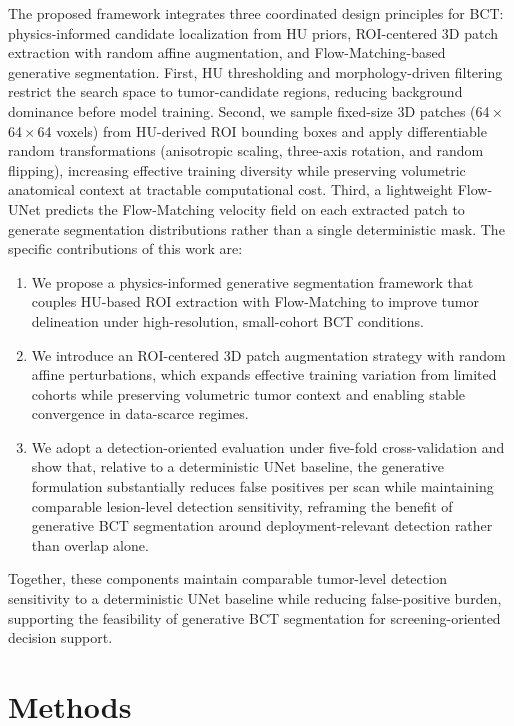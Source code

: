 \documentclass{iopjournal}
\begin{document}
The proposed framework integrates three coordinated design principles for BCT: physics-informed candidate localization from HU priors, ROI-centered 3D patch extraction with random affine augmentation, and Flow-Matching-based generative segmentation. First, HU thresholding and morphology-driven filtering restrict the search space to tumor-candidate regions, reducing background dominance before model training. Second, we sample fixed-size 3D patches (64\,$\times$\,64\,$\times$\,64 voxels) from HU-derived ROI bounding boxes and apply differentiable random transformations (anisotropic scaling, three-axis rotation, and random flipping), increasing effective training diversity while preserving volumetric anatomical context at tractable computational cost. Third, a lightweight Flow-UNet predicts the Flow-Matching velocity field on each extracted patch to generate segmentation distributions rather than a single deterministic mask. The specific contributions of this work are:
\begin{enumerate}
\item We propose a physics-informed generative segmentation framework that couples HU-based ROI extraction with Flow-Matching to improve tumor delineation under high-resolution, small-cohort BCT conditions.
\item We introduce an ROI-centered 3D patch augmentation strategy with random affine perturbations, which expands effective training variation from limited cohorts while preserving volumetric tumor context and enabling stable convergence in data-scarce regimes.
\item We adopt a detection-oriented evaluation under five-fold cross-validation and show that, relative to a deterministic UNet baseline, the generative formulation substantially reduces false positives per scan while maintaining comparable lesion-level detection sensitivity, reframing the benefit of generative BCT segmentation around deployment-relevant detection rather than overlap alone.
\end{enumerate}
Together, these components maintain comparable tumor-level detection sensitivity to a deterministic UNet baseline while reducing false-positive burden, supporting the feasibility of generative BCT segmentation for screening-oriented decision support.

\section{Methods}
\end{document}
